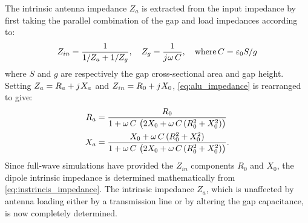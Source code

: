 The intrinsic antenna impedance $Z_a$ is extracted from the input impedance by first taking the parallel combination of the gap and load impedances according to:
%
\begin{equation}
  Z_{in} = \frac{1}{1 / Z_a + 1 / Z_g}, \quad  Z_g = \frac{1}{j\mkern1mu \omega \,C}, \quad \text{where} \,C = \varepsilon_0 S/g
  \label{eq:alu_impedance}
\end{equation}
%
where $S$ and $g$ are respectively the gap cross-sectional area and gap height. Setting $Z_a = R_a + j\mkern1mu X_a$ and $Z_{in} = R_0 + j\mkern1mu X_0$,  \eqref{eq:alu_impedance} is rearranged to give:
%
\begin{subequations}
  \begin{align}
    R_a ={}& \frac{R_0}{1 + \omega \, C \,\left( 2 X_0 + \omega \,C \,(R_0^2 + X_0^2) \right)}
    \label{eq:intrinsic_resistance}\\
    X_a ={}& \frac{X_0 + \omega \, C \,(R_0^2 + X_0^2)} {1 + \omega \, C \,\left( 2 X_0 + \omega \, C \,(R_0^2 + X_0^2) \right)}.
    \label{eq:intrinsic_admittance}
  \end{align}
  \label{eq:instrincis_impedance}%
\end{subequations}
%
Since full-wave simulations have provided the $Z_{in}$ components $R_0$ and $X_0$, the dipole intrinsic impedance is determined mathematically from \eqref{eq:instrincis_impedance}. The intrinsic impedance $Z_a$, which is unaffected by antenna loading either by a transmission line or by altering the gap capacitance, is now completely determined.

